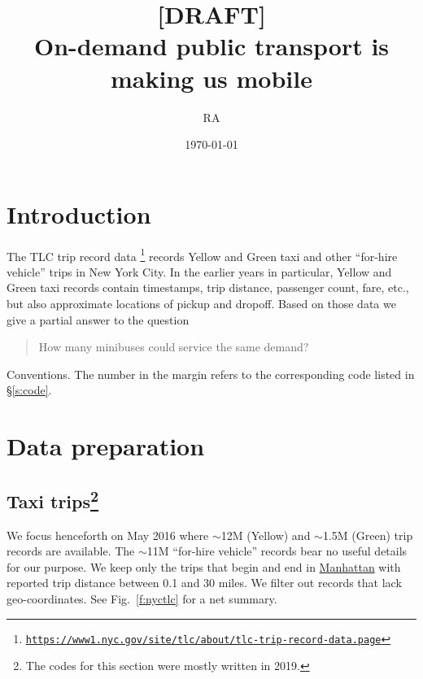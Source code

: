 \documentclass[12pt,notitlepage]{article}
\title{%
	[DRAFT]\\%
	On-demand public transport is making us mobile
}
\author{RA}
\date{\today}
\begin{document}
\maketitle

\section{Introduction}

The TLC trip record data%
\footnote{\href{https://www1.nyc.gov/site/tlc/about/tlc-trip-record-data.page}{\texttt{https://www1.nyc.gov/site/tlc/about/tlc-trip-record-data.page}}}
records 
Yellow and Green taxi
and other ``for-hire vehicle''
trips 
in New York City.
%
In the earlier years
in particular,
Yellow and Green taxi records
contain timestamps,
trip distance, 
passenger count,
fare, etc.,
but also
approximate locations of pickup and dropoff.
%
%
Based on those data
we give a partial answer to the question
\begin{quote}
	How many minibuses could service the same demand?
\end{quote}

%



Conventions.
%
%
The number in the margin refers to the corresponding code listed in \S\ref{s:code}.


%

\section{Data preparation}

\subsection{Taxi trips\footnote{\label{f:oldcode}The codes for this section were mostly written in 2019.}}

\label{s:trips}

We focus henceforth on May 2016
where 
$\sim$12M (Yellow) and $\sim$1.5M (Green)
trip records are available.
%
The $\sim$11M ``for-hire vehicle'' records
bear no useful details for our purpose.
%
%
%
We keep only 
the trips that begin and end in \href{https://www.openstreetmap.org/search?query=manhattan}{Manhattan}
with
reported trip distance between 0.1 and 30 miles.
%
We filter out records that
lack geo-coordinates.
%
%
See Fig.~\ref{f:nyctlc} for a net summary.
%
%
\end{document}

